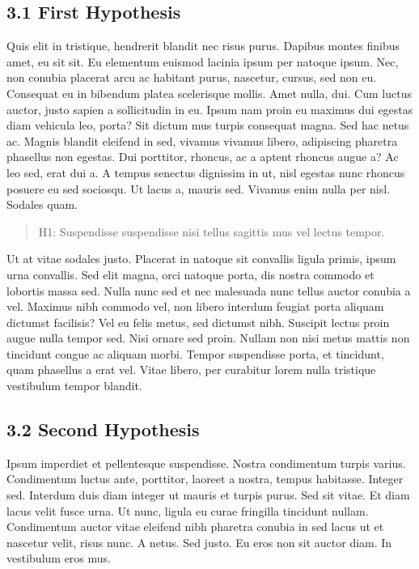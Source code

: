\documentclass[
  12,
]{article}
\begin{document}
\hypertarget{first-hypothesis}{%
\subsection{3.1 First Hypothesis}\label{first-hypothesis}}

Quis elit in tristique, hendrerit blandit nec risus purus. Dapibus
montes finibus amet, eu sit sit. Eu elementum euismod lacinia ipsum per
natoque ipsum. Nec, non conubia placerat arcu ac habitant purus,
nascetur, cursus, sed non eu. Consequat eu in bibendum platea
scelerisque mollis. Amet nulla, dui. Cum luctus auctor, justo sapien a
sollicitudin in eu. Ipsum nam proin eu maximus dui egestas diam vehicula
leo, porta? Sit dictum mus turpis consequat magna. Sed hac netus ac.
Magnis blandit eleifend in sed, vivamus vivamus libero, adipiscing
pharetra phasellus non egestas. Dui porttitor, rhoncus, ac a aptent
rhoncus augue a? Ac leo sed, erat dui a. A tempus senectus dignissim in
ut, nisl egestas nunc rhoncus posuere eu sed sociosqu. Ut lacus a,
mauris sed. Vivamus enim nulla per nisl. Sodales quam.

\begin{quote}
H1: Suspendisse suspendisse nisi tellus sagittis mus vel lectus tempor.
\end{quote}

Ut at vitae sodales justo. Placerat in natoque sit convallis ligula
primis, ipsum urna convallis. Sed elit magna, orci natoque porta, dis
nostra commodo et lobortis massa sed. Nulla nunc sed et nec malesuada
nunc tellus auctor conubia a vel. Maximus nibh commodo vel, non libero
interdum feugiat porta aliquam dictumst facilisis? Vel eu felis metus,
sed dictumst nibh. Suscipit lectus proin augue nulla tempor sed. Nisi
ornare sed proin. Nullam non nisi metus mattis non tincidunt congue ac
aliquam morbi. Tempor suspendisse porta, et tincidunt, quam phasellus a
erat vel. Vitae libero, per curabitur lorem nulla tristique vestibulum
tempor blandit.

\hypertarget{second-hypothesis}{%
\subsection{3.2 Second Hypothesis}\label{second-hypothesis}}

Ipsum imperdiet et pellentesque suspendisse. Nostra condimentum turpis
varius. Condimentum luctus ante, porttitor, laoreet a nostra, tempus
habitasse. Integer sed. Interdum duis diam integer ut mauris et turpis
purus. Sed sit vitae. Et diam lacus velit fusce urna. Ut nunc, ligula eu
curae fringilla tincidunt nullam. Condimentum auctor vitae eleifend nibh
pharetra conubia in sed lacus ut et nascetur velit, risus nunc. A netus.
Sed justo. Eu eros non sit auctor diam. In vestibulum eros mus.
\end{document}
